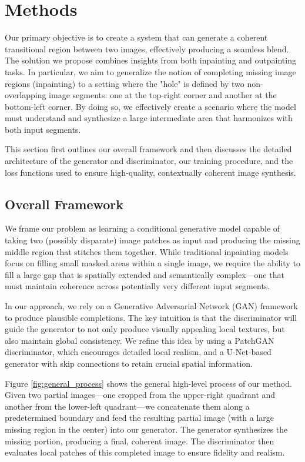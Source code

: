 \documentclass[sigconf]{acmart}
\begin{document}
\section{Methods}

Our primary objective is to create a system that can generate a coherent transitional region between two images, effectively producing a seamless blend. The solution we propose combines insights from both inpainting and outpainting tasks. In particular, we aim to generalize the notion of completing missing image regions (inpainting) to a setting where the "hole" is defined by two non-overlapping image segments: one at the top-right corner and another at the bottom-left corner. By doing so, we effectively create a scenario where the model must understand and synthesize a large intermediate area that harmonizes with both input segments.

This section first outlines our overall framework and then discusses the detailed architecture of the generator and discriminator, our training procedure, and the loss functions used to ensure high-quality, contextually coherent image synthesis.

\subsection*{Overall Framework}

We frame our problem as learning a conditional generative model capable of taking two (possibly disparate) image patches as input and producing the missing middle region that stitches them together. While traditional inpainting models focus on filling small masked areas within a single image, we require the ability to fill a large gap that is spatially extended and semantically complex—one that must maintain coherence across potentially very different input segments.

In our approach, we rely on a Generative Adversarial Network (GAN) framework to produce plausible completions. The key intuition is that the discriminator will guide the generator to not only produce visually appealing local textures, but also maintain global consistency. We refine this idea by using a PatchGAN discriminator, which encourages detailed local realism, and a U-Net-based generator with skip connections to retain crucial spatial information.

Figure \ref{fig:general_process} shows the general high-level process of our method. Given two partial images—one cropped from the upper-right quadrant and another from the lower-left quadrant—we concatenate them along a predetermined boundary and feed the resulting partial image (with a large missing region in the center) into our generator. The generator synthesizes the missing portion, producing a final, coherent image. The discriminator then evaluates local patches of this completed image to ensure fidelity and realism.
\end{document}
